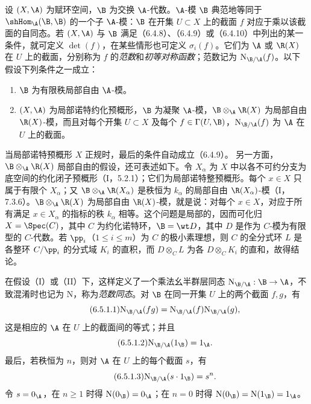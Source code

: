 设 $(X,\A)$ 为赋环空间，$\B$ 为交换 $\A$-代数。$\A$-模 $\B$ 典范地等同于 $\shHom_\A(\B,\B)$ 的一个子 $\A$-模：$\B$ 在开集 $U\subset X$ 上的截面 $f$ 对应于乘以该截面的自同态。若 $(X,\A)$ 与 $\B$ 满足（6.4.8）、（6.4.9）或（6.4.10）中列出的某一条件，就可定义 $\det(f)$，在某些情形也可定义 $\sigma_i(f)$。它们为 $\A$ 或 $\R(X)$ 在 $U$ 上的截面，分别称为 $f$ 的\emph{范数}和\emph{初等对称函数}；范数记为 $\mathrm N_{\B/\A}(f)$。以下假设下列条件之一成立：
\begin{enumerate}[label=\textup{(\Roman*)}]
\item $\B$ 为有限秩局部自由 $\A$-模。
\item $(X,\A)$ 为局部诺特约化预概形，$\B$ 为凝聚 $\A$-模，$\B\otimes_\A\R(X)$ 为局部自由 $\R(X)$-模，而且对每个开集 $U\subset X$ 及每个 $f\in\Gamma(U,\B)$，$\mathrm N_{\B/\A}(f)$ 为 $\A$ 在 $U$ 上的截面。
\end{enumerate}
当局部诺特预概形 $X$ 正规时，最后的条件自动成立（6.4.9）。
另一方面，$\B\otimes_\A\R(X)$ 局部自由的假设，还可表述如下。令 $X_\alpha$ 为 $X$ 中以各不可约分支为底空间的约化闭子预概形（I，5.2.1）；它们为局部诺特整预概形。每个 $x\in X$ 只属于有限个 $X_\alpha$；又 $\B\otimes_\A\R(X_\alpha)$ 是秩恒为 $k_\alpha$ 的局部自由 $\R(X_\alpha)$-模（I，7.3.6）。$\B\otimes_\A\R(X)$ 为局部自由 $\R(X)$-模，就是说：对每个 $x\in X$，对应于所有满足 $x\in X_\alpha$ 的指标的秩 $k_\alpha$ 相等。这个问题是局部的，因而可化归 $X=\Spec(C)$，其中 $C$ 为约化诺特环，$\B=\wt D$，其中 $D$ 是作为 $C$-模为有限型的 $C$-代数。若 $\pp_i$（$1\leq i\leq m$）为 $C$ 的极小素理想，则 $C$ 的全分式环 $L$ 是各整环 $C/\pp_i$ 的分式域 $K_i$ 的直积，而 $D\otimes_C L$ 为各 $D\otimes_C K_i$ 的直和，故得结论。

在假设（I）或（II）下，这样定义了一个乘法幺半群层同态
$\mathrm N_{\B/\A}:\B\to\A$，不致混淆时也记为 $\mathrm N$，称为\emph{范数同态}。对 $\B$ 在同一开集 $U$ 上的两个截面 $f,g$，有
\begin{equation}\tag{6.5.1.1}
\mathrm N_{\B/\A}(fg)=\mathrm N_{\B/\A}(f)\mathrm N_{\B/\A}(g),
\end{equation}
这是相应的 $\A$ 在 $U$ 上的截面间的等式；并且
\begin{equation}\tag{6.5.1.2}
\mathrm N_{\B/\A}(1_\B)=1_\A.
\end{equation}
最后，若秩恒为 $n$，则对 $\A$ 在 $U$ 上的每个截面 $s$，有
\begin{equation}\tag{6.5.1.3}
\mathrm N_{\B/\A}(s\cdot1_\B)=s^n.
\end{equation}
令 $s=0_\A$，在 $n\geq1$ 时得 $\mathrm N(0_\B)=0_\A$；在 $n=0$ 时得 $\mathrm N(0_\B)=\mathrm N(1_\B)=1_\A$。

